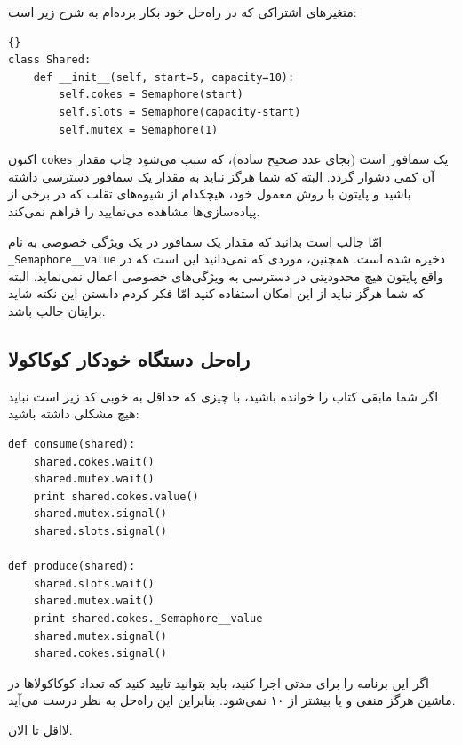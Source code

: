 \documentclass{book}
\newcommand{\clearemptydoublepage}{\newpage\cleardoublepage}
\begin{document}
    متغیرهای اشتراکی که در راه‌حل خود بکار برده‌ام به شرح زیر است:

\begin{latin}
\begin{lstlisting}[title={}]{}
class Shared:
    def __init__(self, start=5, capacity=10):
        self.cokes = Semaphore(start)
        self.slots = Semaphore(capacity-start)
        self.mutex = Semaphore(1)
\end{lstlisting}
\end{latin}

    اکنون {\tt cokes} یک سمافور است (بجای عدد صحیح ساده)، که سبب می‌شود چاپ مقدار آن کمی دشوار گردد. 
    البته که  شما هرگز نباید به مقدار یک سمافور دسترسی داشته باشید و پایتون با روش معمول خود، هیچکدام از شیوه‌های تقلب که در برخی از پیاده‌سازی‌ها  
    مشاهده می‌نمایید را  فراهم نمی‌کند. 

    امّا جالب است بدانید که مقدار یک سمافور در یک ویژگی خصوصی به نام {\tt \_Semaphore\_\_value} ذخیره شده است. 
    همچنین، موردی که نمی‌دانید این است که در واقع پایتون هیچ محدودیتی در دسترسی به ویژگی‌های خصوصی اعمال نمی‌نماید. 
    البته که شما هرگز نباید از این امکان استفاده کنید امّا فکر کردم دانستن این نکته شاید برایتان جالب باشد. 


\clearemptydoublepage
\subsection {راه‌حل دستگاه خودکار کوکاکولا}

    اگر شما مابقی کتاب را خوانده باشید، با چیزی که حداقل به خوبی کد زیر است نباید هیچ مشکلی داشته باشید:

\begin{latin}
\begin{lstlisting}
def consume(shared):
    shared.cokes.wait()
    shared.mutex.wait()
    print shared.cokes.value()
    shared.mutex.signal()
    shared.slots.signal()

def produce(shared):
    shared.slots.wait()
    shared.mutex.wait()
    print shared.cokes._Semaphore__value
    shared.mutex.signal()
    shared.cokes.signal()
\end{lstlisting}
\end{latin}

    اگر این برنامه را برای مدتی اجرا کنید، باید بتوانید تایید کنید که تعداد کوکاکولاها در ماشین هرگز منفی و یا بیشتر از ۱۰ نمی‌شود. 
    بنابراین این راه‌حل به نظر درست می‌آید. 

    لااقل تا الان. 
\end{document}
